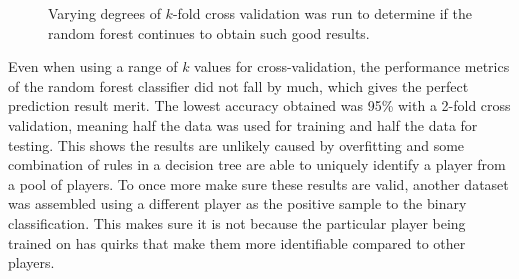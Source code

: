 \documentclass[Report.tex]{subfiles}
\begin{document}
\newcommand{\rfplotbar}[2] {
\addplot+[mark=none] table [x=cv, y=#1, col sep=comma] {data/15-game-rf.csv};
\addlegendentry{#2}
}
\begin{figure}[H]
\caption{Varying degrees of $k$-fold cross validation was run to determine if the random forest continues to obtain such good results.}
\end{figure}

Even when using a range of $k$ values for cross-validation, the performance metrics of the random forest classifier did not fall by much, which gives the perfect prediction result merit. The lowest accuracy obtained was 95\% with a 2-fold cross validation, meaning half the data was used for training and half the data for testing. This shows the results are unlikely caused by overfitting and some combination of rules in a decision tree are able to uniquely identify a player from a pool of players. To once more make sure these results are valid, another dataset was assembled using a different player as the positive sample to the binary classification. This makes sure it is not because the particular player being trained on has quirks that make them more identifiable compared to other players. 
\end{document}
